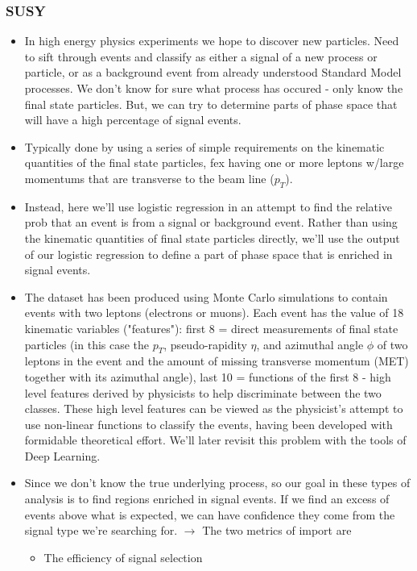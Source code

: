 \documentclass[norsk,a4paper,11pt]{article}
\begin{document}
\subsubsection{SUSY}
\begin{itemize}
	\item In high energy physics experiments we hope to discover new particles. Need to sift through events and classify as either a signal of a new process or particle, or as a background event from already understood Standard Model processes. We don't know for sure what process has occured - only know the final state particles. But, we can try to determine parts of phase space that will have a high percentage of signal events. 
	\item Typically done by using a series of simple requirements on the kinematic quantities of the final state particles, fex having one or more leptons w/large momentums that are transverse to the beam line ($p_T$).
	\item Instead, here we'll use logistic regression in an attempt to find the relative prob that an event is from a signal or background event. Rather than using the kinematic quantities of final state particles directly, we'll use the output of our logistic regression to define a part of phase space that is enriched in signal events.
	\item The dataset has been produced using Monte Carlo simulations to contain events with two leptons (electrons or muons). Each event has the value of 18 kinematic variables ("features"): first 8 = direct measurements of final state particles (in this case the $p_T$, pseudo-rapidity $\eta$, and azimuthal angle $\phi$ of two leptons in the event and the amount of missing transverse momentum (MET) together with its azimuthal angle), last 10 = functions of the first 8 - high level features derived by physicists to help discriminate between the two classes. These high level features can be viewed as the physicist's attempt to use non-linear functions to classify the events, having been developed with formidable theoretical effort. We'll later revisit this problem with the tools of Deep Learning.
	\item Since we don't know the true underlying process, so our goal in these types of analysis is to find regions enriched in signal events. If we find an excess of events above what is expected, we can have confidence they come from the signal type we're searching for. $\rightarrow$ The two metrics of import are
	\begin{itemize}
		\item The efficiency of signal selection

\end{itemize}
\end{itemize}
\end{document}
